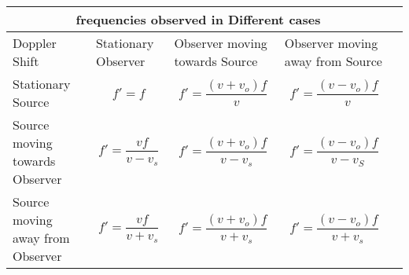 
\setlength{\arrayrulewidth}{0.5mm}
\setlength{\tabcolsep}{14pt}
\renewcommand{\arraystretch}{0.8}


\begin{tabular}{ |p{1cm}|p{1cm}|p{1.5cm}|p{1.5cm}|p{}}
    \hline
    \multicolumn{4}{|c|}{frequencies observed in Different cases} \\
    \hline
    Doppler Shift &Stationary Observer &Observer moving towards Source &Observer moving away from Source\\
    \hline
    Stationary Source & $$f' = f$$& $$f' = \frac{(v+v_o) f}{v}$$&$$f' = \frac{(v-v_o) f}{v}$$\\
    \hline
    Source moving towards Observer &$$f' = \frac{v f}{v-v_s }$$&$$f' = \frac{(v+v_o) f}{v- v_s }$$&$$f' = \frac{(v-v_o) f}{v- v_S }$$\\
    \hline
    Source moving away from Observer&$$f' = \frac{v f}{v+ v_s }$$&$$f' = \frac{(v+v_o) f}{v+ v_s }$$&$$f' = \frac{(v-v_o) f}{v+ v_s }$$\\
    \hline
    \end{tabular}
